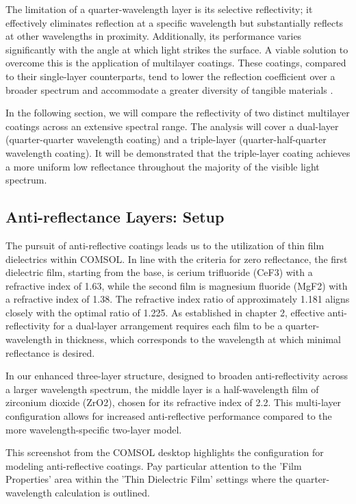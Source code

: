 The limitation of a quarter-wavelength layer is its selective reflectivity; it effectively eliminates reflection at a specific wavelength but substantially reflects at other wavelengths in proximity. Additionally, its performance varies significantly with the angle at which light strikes the surface. A viable solution to overcome this is the application of multilayer coatings. These coatings, compared to their single-layer counterparts, tend to lower the reflection coefficient over a broader spectrum and accommodate a greater diversity of tangible materials \cite{pedrotti_introduction_2007}.

In the following section, we will compare the reflectivity of two distinct multilayer coatings across an extensive spectral range. The analysis will cover a dual-layer (quarter-quarter wavelength coating) and a triple-layer (quarter-half-quarter wavelength coating). It will be demonstrated that the triple-layer coating achieves a more uniform low reflectance throughout the majority of the visible light spectrum.


\subsection{Anti-reflectance Layers: Setup}

The pursuit of anti-reflective coatings leads us to the utilization of thin film dielectrics within COMSOL. In line with the criteria for zero reflectance, the first dielectric film, starting from the base, is cerium trifluoride (CeF3) with a refractive index of 1.63, while the second film is magnesium fluoride (MgF2) with a refractive index of 1.38. The refractive index ratio of approximately 1.181 aligns closely with the optimal ratio of 1.225. As established in chapter 2, effective anti-reflectivity for a dual-layer arrangement requires each film to be a quarter-wavelength in thickness, which corresponds to the wavelength at which minimal reflectance is desired.

In our enhanced three-layer structure, designed to broaden anti-reflectivity across a larger wavelength spectrum, the middle layer is a half-wavelength film of zirconium dioxide (ZrO2), chosen for its refractive index of 2.2. This multi-layer configuration allows for increased anti-reflective performance compared to the more wavelength-specific two-layer model.

This screenshot from the COMSOL desktop highlights the configuration for modeling anti-reflective coatings. Pay particular attention to the 'Film Properties' area within the 'Thin Dielectric Film' settings where the quarter-wavelength calculation is outlined.

